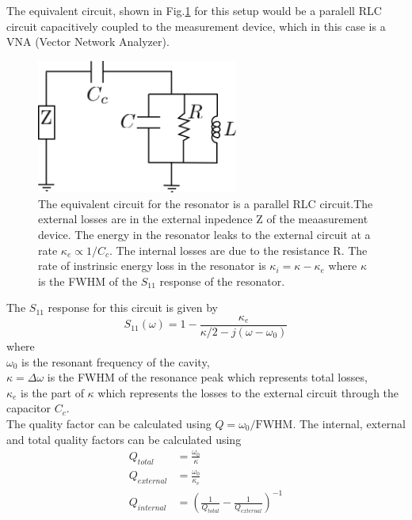 The equivalent circuit, shown in Fig.\ref{fig:external circuit} for this setup would be a paralell RLC circuit capacitively coupled to the measurement device, which in this case is a VNA (Vector Network Analyzer).

\begin{figure}
\centering
\includegraphics[width=250px]{Figures/equivalent}
\decoRule
\caption[External coupling circuit]{The equivalent circuit for the resonator is a parallel RLC circuit.The external losses are in the external inpedence Z of the meaasurement device. The energy in the resonator leaks to the external circuit at a rate $\kappa_e\propto 1/C_c$. The internal losses are due to the resistance R. The rate of instrinsic energy loss in the resonator is $\kappa_i = \kappa - \kappa_e$ where $\kappa$ is the FWHM of the $S_{11}$ response of the resonator.}
\label{fig:external circuit}
\end{figure}

The $S_{11}$ response for this circuit is given by \cite{Aspelmeyer2014}
\begin{equation}
S_{11}(\omega) = 1-\frac{\kappa_e}{\kappa/2-j(\omega-\omega_0)}
\end{equation}
where\\
$\omega_0$ is the resonant frequency of the cavity,\\
$\kappa = \Delta\omega$ is the FWHM of the resonance peak which represents total losses,\\
$\kappa_e$ is the part of $\kappa$ which represents the losses to the external circuit through the capacitor $C_c$.\\
The quality factor can be calculated using $Q = \omega_0/\text{FWHM}$. The internal, external and total quality factors can be calculated using
\begin{align}
Q_{total} &= \frac{\omega_0}{\kappa}\\
Q_{external} &= \frac{\omega_0}{\kappa_e}\\
Q_{internal} &= \left(\frac{1}{Q_{total}}-\frac{1}{Q_{external}}\right)^{-1}\\
\end{align}

